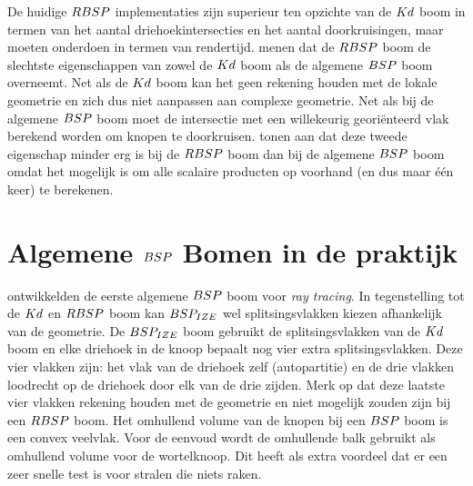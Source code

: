     De huidige $RBSP$ implementaties zijn superieur ten opzichte van de $Kd$ boom in termen van het aantal driehoekintersecties en het aantal doorkruisingen, maar moeten onderdoen in termen van rendertijd.
    \authorIze{} \cite{ize} menen dat de $RBSP$ boom de slechtste eigenschappen van zowel de $Kd$ boom als de algemene $BSP$ boom overneemt. 
    Net als de $Kd$ boom kan het geen rekening houden met de lokale geometrie en zich dus niet aanpassen aan complexe geometrie.
    Net als bij de algemene $BSP$ boom moet de intersectie met een willekeurig georiënteerd vlak berekend worden om knopen te doorkruisen. \authorBudge{} \cite{Budge} tonen aan dat deze tweede eigenschap minder erg is bij de $RBSP$ boom dan bij de algemene $BSP$ boom omdat het mogelijk is om alle scalaire producten op voorhand (en dus maar één keer) te berekenen.

\section{Algemene $BSP$ Bomen in de praktijk}
    \authorIze{} \cite{ize} ontwikkelden de eerste algemene $BSP$ boom voor \textit{ray tracing}.
    In tegenstelling tot de $Kd$ en $RBSP$ boom kan $BSP_{IZE}$ wel splitsingsvlakken kiezen afhankelijk van de geometrie.
    De $BSP_{IZE}$ boom gebruikt de splitsingsvlakken van de $Kd$ boom en elke driehoek in de knoop bepaalt nog vier extra splitsingsvlakken.
    Deze vier vlakken zijn: het vlak van de driehoek zelf (autopartitie) en de drie vlakken loodrecht op de driehoek door elk van de drie zijden.
    Merk op dat deze laatste vier vlakken rekening houden met de geometrie en niet mogelijk zouden zijn bij een $RBSP$ boom.
    Het omhullend volume van de knopen bij een $BSP$ boom is een convex veelvlak.
    Voor de eenvoud wordt de omhullende balk gebruikt als omhullend volume voor de wortelknoop.
    Dit heeft als extra voordeel dat er een zeer snelle test is voor stralen die niets raken. \\

